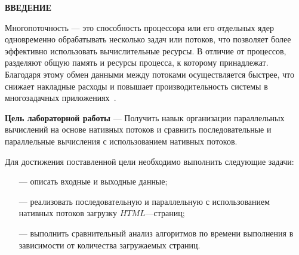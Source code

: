 \begin{center}
    \textbf{ВВЕДЕНИЕ}
\end{center}

Многопоточность — это способность процессора или его отдельных ядер одновременно обрабатывать несколько задач или потоков, что позволяет более эффективно использовать вычислительные ресурсы. В отличие от процессов, разделяют общую память и ресурсы процесса, к которому принадлежат. Благодаря этому обмен данными между потоками осуществляется быстрее, что снижает накладные расходы и повышает производительность системы в многозадачных приложениях~\cite{threads}.

\textbf{Цель лабораторной работы} --- Получить навык организации параллельных вычислений на основе нативных потоков и сравнить последовательные и параллельные вычисления с использованием нативных потоков.

Для достижения поставленной цели необходимо выполнить следующие задачи:
\begin{itemize}
    \item[---] описать входные и выходные данные;
    \item[---] реализовать последовательную и параллельную с использованием нативных потоков загрузку  $HTML$---страниц;
    \item[---] выполнить сравнительный анализ алгоритмов по времени выполнения в зависимости от количества загружаемых страниц.
\end{itemize}